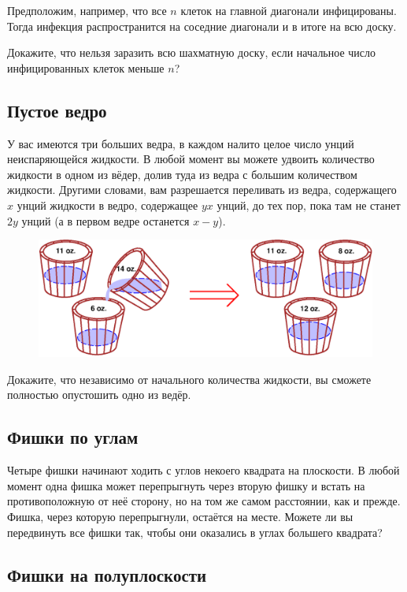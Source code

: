 Предположим, например, что все $n$ клеток на главной диагонали инфицированы.
Тогда инфекция распространится на соседние диагонали и в итоге на всю доску.

Докажите, что нельзя заразить всю шахматную доску, если начальное число инфицированных клеток меньше $n$?

\subsection*{Пустое ведро}%

У вас имеются три больших ведра, в каждом налито целое число унций неиспаряющейся жидкости.
В любой момент вы можете удвоить количество жидкости в одном из вёдер, долив туда из ведра с большим количеством жидкости.
Другими словами, вам разрешается переливать из ведра, содержащего $x$ унций жидкости в ведро, содержащее 
$y x$ унций, до тех пор, пока там не станет $2y$ унций (а в первом ведре останется $x-y$).

\begin{figure}
\centering
\includegraphics[scale=0.6]{Figs/Algorithms/buckets}
\end{figure}

Докажите, что независимо от начального количества жидкости, вы сможете полностью опустошить одно из ведёр.

\subsection*{Фишки по углам}%

Четыре фишки начинают ходить с углов некоего квадрата на плоскости.
В любой момент одна фишка может перепрыгнуть через вторую фишку и встать на противоположную от неё сторону, но на том же самом расстоянии, как и прежде.
Фишка, через которую перепрыгнули, остаётся на месте.
Можете ли вы передвинуть все фишки так, чтобы они оказались в углах большего квадрата?

\subsection*{Фишки на полуплоскости}%

